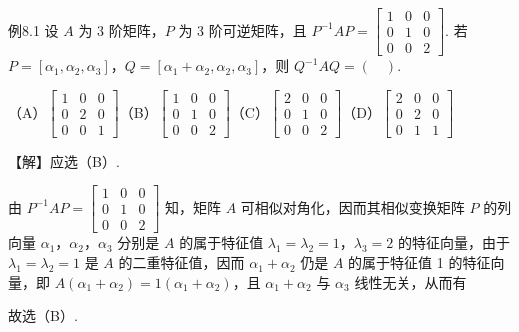 



\begin{fcard}{例8.1}
设 $A$ 为 3 阶矩阵，$P$ 为 3 阶可逆矩阵，且 $P^{-1}AP=\begin{bmatrix}1&0&0\\0&1&0\\0&0&2\end{bmatrix}$. 若 $P=[\alpha_1,\alpha_2,\alpha_3]$，$Q=[\alpha_1+\alpha_2,\alpha_2,\alpha_3]$，则 $Q^{-1}AQ=(\quad)$.

（A）$\begin{bmatrix}1&0&0\\0&2&0\\0&0&1\end{bmatrix}$\qquad（B）$\begin{bmatrix}1&0&0\\0&1&0\\0&0&2\end{bmatrix}$\qquad（C）$\begin{bmatrix}2&0&0\\0&1&0\\0&0&2\end{bmatrix}$\qquad（D）$\begin{bmatrix}2&0&0\\0&2&0\\0&1&1\end{bmatrix}$

【解】应选（B）.

由 $P^{-1}AP=\begin{bmatrix}1&0&0\\0&1&0\\0&0&2\end{bmatrix}$ 知，矩阵 $A$ 可相似对角化，因而其相似变换矩阵 $P$ 的列向量 $\alpha_1$，$\alpha_2$，$\alpha_3$ 分别是 $A$ 的属于特征值 $\lambda_1=\lambda_2=1$，$\lambda_3=2$ 的特征向量，由于 $\lambda_1=\lambda_2=1$ 是 $A$ 的二重特征值，因而 $\alpha_1+\alpha_2$ 仍是 $A$ 的属于特征值 1 的特征向量，即 $A(\alpha_1+\alpha_2)=1(\alpha_1+\alpha_2)$，且 $\alpha_1+\alpha_2$ 与 $\alpha_3$ 线性无关，从而有


故选（B）.
\end{fcard}

